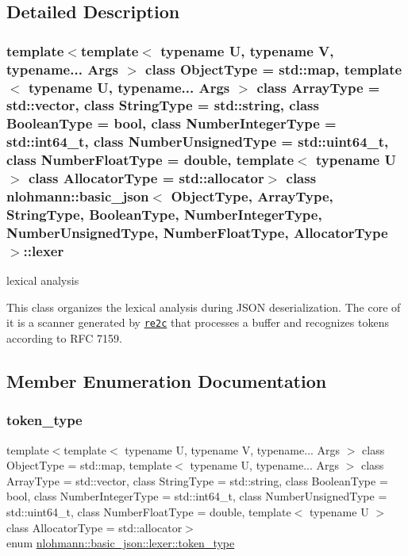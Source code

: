 \subsection{Detailed Description}
\subsubsection*{template$<$template$<$ typename U, typename V, typename... Args $>$ class Object\+Type = std\+::map, template$<$ typename U, typename... Args $>$ class Array\+Type = std\+::vector, class String\+Type = std\+::string, class Boolean\+Type = bool, class Number\+Integer\+Type = std\+::int64\+\_\+t, class Number\+Unsigned\+Type = std\+::uint64\+\_\+t, class Number\+Float\+Type = double, template$<$ typename U $>$ class Allocator\+Type = std\+::allocator$>$\newline
class nlohmann\+::basic\+\_\+json$<$ Object\+Type, Array\+Type, String\+Type, Boolean\+Type, Number\+Integer\+Type, Number\+Unsigned\+Type, Number\+Float\+Type, Allocator\+Type $>$\+::lexer}

lexical analysis 

This class organizes the lexical analysis during J\+S\+ON deserialization. The core of it is a scanner generated by \href{http://re2c.org}{\tt re2c} that processes a buffer and recognizes tokens according to R\+FC 7159. 

\subsection{Member Enumeration Documentation}
\hypertarget{classnlohmann_1_1basic__json_1_1lexer_a96887d6cd131e3d3a85a9d71fbdbcdf7}{}\label{classnlohmann_1_1basic__json_1_1lexer_a96887d6cd131e3d3a85a9d71fbdbcdf7} 
\subsubsection{\texorpdfstring{token\+\_\+type}{token\_type}}
{\footnotesize\ttfamily template$<$template$<$ typename U, typename V, typename... Args $>$ class Object\+Type = std\+::map, template$<$ typename U, typename... Args $>$ class Array\+Type = std\+::vector, class String\+Type  = std\+::string, class Boolean\+Type  = bool, class Number\+Integer\+Type  = std\+::int64\+\_\+t, class Number\+Unsigned\+Type  = std\+::uint64\+\_\+t, class Number\+Float\+Type  = double, template$<$ typename U $>$ class Allocator\+Type = std\+::allocator$>$ \\
enum \hyperlink{classnlohmann_1_1basic__json_1_1lexer_a96887d6cd131e3d3a85a9d71fbdbcdf7}{nlohmann\+::basic\+\_\+json\+::lexer\+::token\+\_\+type}\hspace{0.3cm}{\ttfamily [strong]}}



